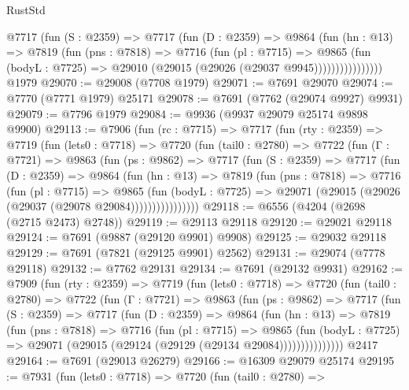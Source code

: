 \begin{lexlean}{RustStd}
\begin{coremodule}
                @7717
                  (fun (S : @2359) =>
                  @7717
                    (fun (D : @2359) =>
                    @9864
                      (fun (hn : @13) =>
                      @7819
                        (fun (pns : @7818) =>
                        @7716
                          (fun (pl : @7715) =>
                          @9865
                            (fun (bodyL : @7725) =>
                            @29010 (@29015 (@29026 (@29037 @9945))))))))))))))))
    @1979
@29070 := @29008 (@7708 @1979)
@29071 := @7691 @29070
@29074 := @7770 (@7771 @1979) @25171
@29078 := @7691 (@7762 (@29074 @9927) @9931)
@29079 := @7796 @1979
@29084 := @9936 (@9937 @29079 @25174 @9898 @9900)
@29113 := @7906
    (fun (rc : @7715) =>
    @7717
      (fun (rty : @2359) =>
      @7719
        (fun (lets0 : @7718) =>
        @7720
          (fun (tail0 : @2780) =>
          @7722
            (fun (Γ : @7721) =>
            @9863
              (fun (ps : @9862) =>
              @7717
                (fun (S : @2359) =>
                @7717
                  (fun (D : @2359) =>
                  @9864
                    (fun (hn : @13) =>
                    @7819
                      (fun (pns : @7818) =>
                      @7716
                        (fun (pl : @7715) =>
                        @9865
                          (fun (bodyL : @7725) =>
                          @29071 (@29015 (@29026 (@29037 (@29078 @29084))))))))))))))))
@29118 := @6556 (@4204 (@2698 (@2715 @2473) @2748))
@29119 := @29113 @29118
@29120 := @29021 @29118
@29124 := @7691 (@9887 (@29120 @9901) @9908)
@29125 := @29032 @29118
@29129 := @7691 (@7821 (@29125 @9901) @2562)
@29131 := @29074 (@7778 @29118)
@29132 := @7762 @29131
@29134 := @7691 (@29132 @9931)
@29162 := @7909
    (fun (rty : @2359) =>
    @7719
      (fun (lets0 : @7718) =>
      @7720
        (fun (tail0 : @2780) =>
        @7722
          (fun (Γ : @7721) =>
          @9863
            (fun (ps : @9862) =>
            @7717
              (fun (S : @2359) =>
              @7717
                (fun (D : @2359) =>
                @9864
                  (fun (hn : @13) =>
                  @7819
                    (fun (pns : @7818) =>
                    @7716
                      (fun (pl : @7715) =>
                      @9865
                        (fun (bodyL : @7725) =>
                        @29071 (@29015 (@29124 (@29129 (@29134 @29084)))))))))))))))
    @2417
@29164 := @7691 (@29013 @26279)
@29166 := @16309 @29079 @25174
@29195 := @7931
    (fun (lets0 : @7718) =>
    @7720
      (fun (tail0 : @2780) =>

\end{coremodule}
\end{lexlean}
